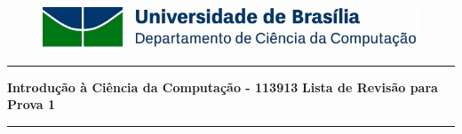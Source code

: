 \documentclass[a4paper, 12pt]{article}
\begin{document}
\begin{figure}[H]
	\includegraphics[scale=0.9]{UnB_CiC_Logo.jpg}
\end{figure}
\noindent\rule{\textwidth}{0.4pt}
\begin{center}
	\textbf{{\Large Introdução à Ciência da Computação - 113913}} \newline \newline
	\textbf{{\large Lista de Revisão para Prova 1}} \\
	\noindent\rule{\textwidth}{0.4pt}
	\newline
\end{center}
\end{document}
